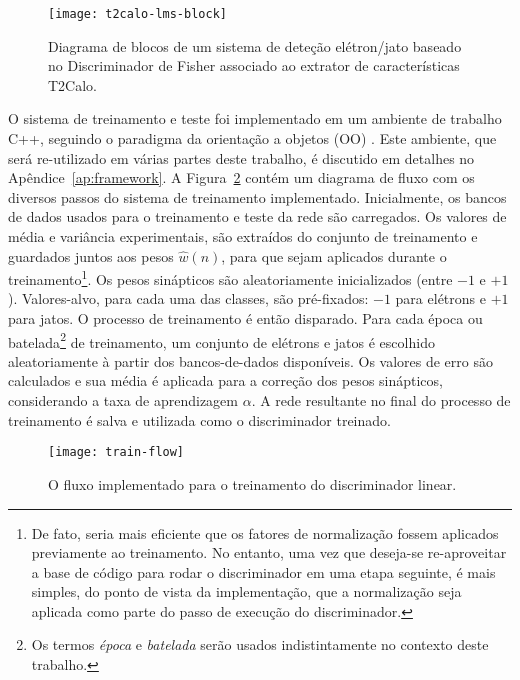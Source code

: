 \begin{figure}
\begin{center}
\texttt{[image: t2calo-lms-block]}
\end{center}
\caption{Diagrama de blocos de um sistema de deteção elétron/jato baseado no
Discriminador de Fisher associado ao extrator de características T2Calo.}
\label{fig:t2calo-lms-block}
\end{figure}

O sistema de treinamento e teste foi implementado em um ambiente de trabalho
C++, seguindo o paradigma da orientação a objetos (OO) \cite{stroustrup,
booch}. Este ambiente, que será re-utilizado em várias partes deste trabalho,
é discutido em detalhes no Apêndice~\ref{ap:framework}. A
Figura~\ref{fig:train-flow} contém um diagrama de fluxo com os diversos passos
do sistema de treinamento implementado. Inicialmente, os bancos de dados
usados para o treinamento e teste da rede são carregados. Os valores de média
e variância experimentais, são extraídos do conjunto de treinamento e
guardados juntos aos pesos $\hat{w}(n)$, para que sejam aplicados durante o
treinamento\footnote{De fato, seria mais eficiente que os fatores de
normalização fossem aplicados previamente ao treinamento. No entanto, uma vez
que deseja-se re-aproveitar a base de código para rodar o discriminador em uma
etapa seguinte, é mais simples, do ponto de vista da implementação, que a
normalização seja aplicada como parte do passo de execução do
discriminador.}. Os pesos sinápticos são aleatoriamente inicializados (entre
$-1$ e $+1$). Valores-alvo, para cada uma das classes, são pré-fixados: $-1$
para elétrons e $+1$ para jatos. O processo de treinamento é então
disparado. Para cada época ou batelada\footnote{Os termos \textit{época} e
\textit{batelada} serão usados indistintamente no contexto deste trabalho.}
de treinamento, um conjunto de elétrons e jatos é escolhido aleatoriamente à
partir dos bancos-de-dados disponíveis. Os valores de erro são calculados e
sua média é aplicada para a correção dos pesos sinápticos, considerando a taxa
de aprendizagem $\alpha$. A rede resultante no final do processo de
treinamento é salva e utilizada como o discriminador treinado.

\begin{figure}
\begin{center}
\texttt{[image: train-flow]}
\end{center}
\caption{O fluxo implementado para o treinamento do discriminador linear.}
\label{fig:train-flow}
\end{figure}

